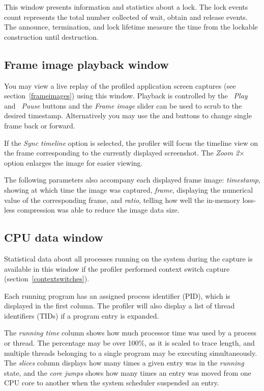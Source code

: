\documentclass[hidelinks,titlepage,a4paper,twoside]{article}
\begin{document}
This window presents information and statistics about a lock. The lock events count represents the total number collected of wait, obtain and release events. The announce, termination, and lock lifetime measure the time from the lockable construction until destruction.

\subsection{Frame image playback window}
\label{playback}

You may view a live replay of the profiled application screen captures (see section~\ref{frameimages}) using this window. Playback is controlled by the \emph{\faPlay~Play} and \emph{\faPause~Pause} buttons and the \emph{Frame image} slider can be used to scrub to the desired timestamp. Alternatively you may use the \emph{\faCaretLeft} and \emph{\faCaretRight} buttons to change single frame back or forward.

If the \emph{Sync timeline} option is selected, the profiler will focus the timeline view on the frame corresponding to the currently displayed screenshot. The \emph{Zoom 2$\times$} option enlarges the image for easier viewing.

The following parameters also accompany each displayed frame image: \emph{timestamp}, showing at which time the image was captured, \emph{frame}, displaying the numerical value of the corresponding frame, and \emph{ratio}, telling how well the in-memory loss-less compression was able to reduce the image data size.

\subsection{CPU data window}
\label{cpudata}

Statistical data about all processes running on the system during the capture is available in this window if the profiler performed context switch capture (section~\ref{contextswitches}).

Each running program has an assigned process identifier (PID), which is displayed in the first column. The profiler will also display a list of thread identifiers (TIDs) if a program entry is expanded.

The \emph{running time} column shows how much processor time was used by a process or thread. The percentage may be over 100\%, as it is scaled to trace length, and multiple threads belonging to a single program may be executing simultaneously. The \emph{slices} column displays how many times a given entry was in the \emph{running} state, and the \emph{core jumps} shows how many times an entry was moved from one CPU core to another when the system scheduler suspended an entry.
\end{document}

